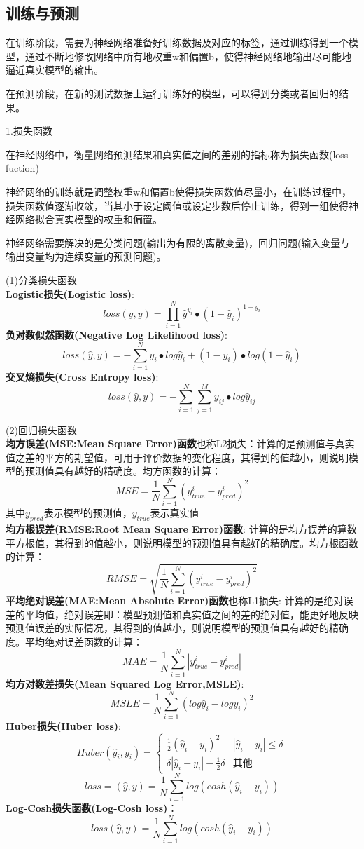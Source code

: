 \documentclass[openbib]{article}
\begin{document}
\subsection{训练与预测}
在训练阶段，需要为神经网络准备好训练数据及对应的标签，通过训练得到一个模型，通过不断地修改网络中所有地权重w和偏置b，使得神经网络地输出尽可能地逼近真实模型的输出。

在预测阶段，在新的测试数据上运行训练好的模型，可以得到分类或者回归的结果。
\begin{center}
	1.损失函数
\end{center}

在神经网络中，衡量网络预测结果和真实值之间的差别的指标称为损失函数(loss fuction)

神经网络的训练就是调整权重w和偏置b使得损失函数值尽量小，在训练过程中，损失函数值逐渐收敛，当其小于设定阈值或设定步数后停止训练，得到一组使得神经网络拟合真实模型的权重和偏置。

神经网络需要解决的是分类问题(输出为有限的离散变量)，回归问题(输入变量与输出变量均为连续变量的预测问题)。

(1)分类损失函数
\\\textbf{Logistic损失(Logistic loss)}:
$$loss(\hat{y},y)=\prod_{i=1}^{N}\hat{y}^{y_i}\bullet(1-\hat{y}_i)^{1-y_i}$$
\textbf{负对数似然函数(Negative Log Likelihood loss)}:
$$loss(\hat{y},y)=-\sum_{i=1}^{N}y_i\bullet log\hat{y}_i+(1-y_i)\bullet log(1-\hat{y}_i)$$
\textbf{交叉熵损失(Cross Entropy loss)}:
$$loss(\hat{y},y)=-\sum_{i=1}^{N}\sum_{j=1}^{M}y_{ij}\bullet log\hat{y}_{ij}$$

(2)回归损失函数
\\\textbf{均方误差(MSE:Mean Square Error)函数}也称L2损失：计算的是预测值与真实值之差的平方的期望值，可用于评价数据的变化程度，其得到的值越小，则说明模型的预测值具有越好的精确度。均方函数的计算：
$$MSE=\frac{1}{N}\sum_{i=1}^{N}(y_{true}^i-y_{pred}^i)^2$$
其中$y_{pred}$表示模型的预测值，$y_{true}$表示真实值
\\\textbf{均方根误差(RMSE:Root Mean Square Error)函数}:
计算的是均方误差的算数平方根值，其得到的值越小，则说明模型的预测值具有越好的精确度。均方根函数的计算：
$$RMSE=\sqrt{\frac{1}{N}\sum_{i=1}^{N}(y_{true}^i-y_{pred}^i)^2}$$
\textbf{平均绝对误差(MAE:Mean Absolute Error)函数}也称L1损失:
计算的是绝对误差的平均值，绝对误差即：模型预测值和真实值之间的差的绝对值，能更好地反映预测值误差的实际情况，其得到的值越小，则说明模型的预测值具有越好的精确度。平均绝对误差函数的计算：
$$MAE=\frac{1}{N}\sum_{i=1}^{N}\left| y_{true}^i-y_{pred}^i \right|$$
\textbf{均方对数差损失(Mean Squared Log Error,MSLE)}:
$$MSLE=\frac{1}{N}\sum_{i=1}^{N}(log\hat{y}_i-logy_i)^2$$
\textbf{Huber损失(Huber loss)}:
$$Huber(\hat{y}_i,y_i) = \left\{ \begin{array}{cl}
	\frac{1}{2}(\hat{y}_i-y_i)^2 & |\hat{y}_i-y_i|\le \delta \\
	\delta|\hat{y}_i-y_i|-\frac{1}{2}\delta & \text{其他}
\end{array} \right.$$
$$loss=(\hat{y},y)=\frac{1}{N}\sum_{i=1}^{N}log(cosh(\hat{y}_i-y_i))$$
\textbf{Log-Cosh损失函数(Log-Cosh loss)}：
$$loss(\hat{y},y)=\frac{1}{N}\sum_{i=1}^{N}log(cosh(\hat{y}_i-y_i))$$
\end{document}
